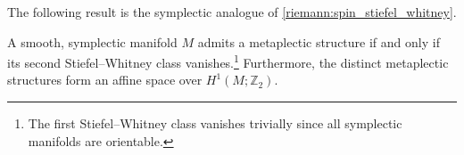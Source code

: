     The following result is the symplectic analogue of \cref{riemann:spin_stiefel_whitney}.
    \begin{property}[Obstruction]
        A smooth, symplectic manifold $M$ admits a metaplectic structure if and only if its second Stiefel--Whitney class vanishes.\footnote{The first Stiefel--Whitney class vanishes trivially since all symplectic manifolds are orientable.} Furthermore, the distinct metaplectic structures form an affine space over $H^1(M;\mathbb{Z}_2)$.
    \end{property}

